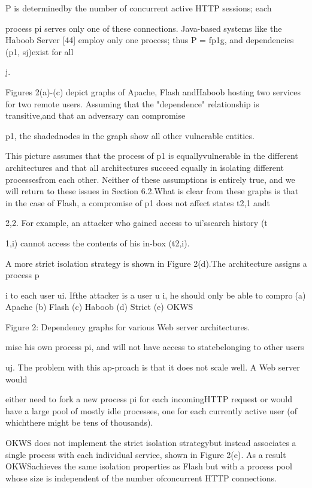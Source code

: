 P is determinedby the number of concurrent active HTTP sessions; each

process pi serves only one of these connections. Java-based systems like the Haboob Server [44] employ only
one process; thus P = fp1g, and dependencies (p1, sj)exist for all

j.

Figures 2(a)-(c) depict graphs of Apache, Flash andHaboob hosting two services for two remote users. Assuming that the "dependence" relationship is transitive,and that an adversary can compromise

p1, the shadednodes in the graph show all other vulnerable entities.

This picture assumes that the process of p1 is equallyvulnerable in the different architectures and that all architectures succeed equally in isolating different processesfrom each other. Neither of these assumptions is entirely
true, and we will return to these issues in Section 6.2.What is clear from these graphs is that in the case of
Flash, a compromise of p1 does not affect states t2,1 andt

2,2. For example, an attacker who gained access to ui'ssearch history (t

1,i) cannot access the contents of his in-box
(t2,i).

A more strict isolation strategy is shown in Figure 2(d).The architecture assigns a process p

i to each user ui. Ifthe attacker is a user u
i, he should only be able to compro(a) Apache (b) Flash (c) Haboob (d) Strict (e) OKWS

Figure 2: Dependency graphs for various Web server architectures.

mise his own process pi, and will not have access to statebelonging to other users

uj. The problem with this ap-proach is that it does not scale well. A Web server would

either need to fork a new process pi for each incomingHTTP request or would have a large pool of mostly idle
processes, one for each currently active user (of whichthere might be tens of thousands).

OKWS does not implement the strict isolation strategybut instead associates a single process with each individual service, shown in Figure 2(e). As a result OKWSachieves the same isolation properties as Flash but with a
process pool whose size is independent of the number ofconcurrent HTTP connections.

